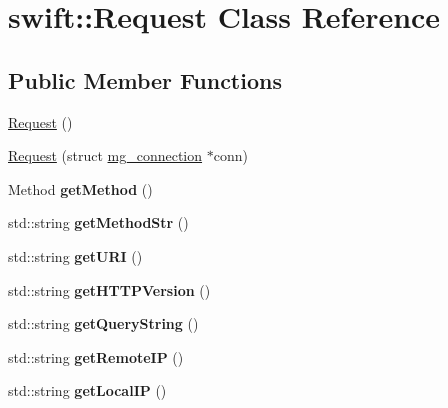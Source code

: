 \hypertarget{classswift_1_1_request}{\section{swift\-:\-:Request Class Reference}
\label{classswift_1_1_request}
}
\subsection*{Public Member Functions}
\begin{DoxyCompactItemize}
\item 
\hyperlink{classswift_1_1_request_a229fbc0523e779262551de6f4ea2c920}{Request} ()
\item 
\hyperlink{classswift_1_1_request_aede86c57b7c39bc6577a4c4f2f2bf0b8}{Request} (struct \hyperlink{structmg__connection}{mg\-\_\-connection} $\ast$conn)
\item 
\hypertarget{classswift_1_1_request_a328f2b94e10e080c5fd1b6387b71137d}{Method {\bfseries get\-Method} ()}\label{classswift_1_1_request_a328f2b94e10e080c5fd1b6387b71137d}

\item 
\hypertarget{classswift_1_1_request_a65044036527328dd16d663e188ea0a9b}{std\-::string {\bfseries get\-Method\-Str} ()}\label{classswift_1_1_request_a65044036527328dd16d663e188ea0a9b}

\item 
\hypertarget{classswift_1_1_request_adc50d14c9210515e0787efc6085f59c3}{std\-::string {\bfseries get\-U\-R\-I} ()}\label{classswift_1_1_request_adc50d14c9210515e0787efc6085f59c3}

\item 
\hypertarget{classswift_1_1_request_ade67461a7ea078229ec148f16b419395}{std\-::string {\bfseries get\-H\-T\-T\-P\-Version} ()}\label{classswift_1_1_request_ade67461a7ea078229ec148f16b419395}

\item 
\hypertarget{classswift_1_1_request_a271ca3d7daa2541890db65560416443e}{std\-::string {\bfseries get\-Query\-String} ()}\label{classswift_1_1_request_a271ca3d7daa2541890db65560416443e}

\item 
\hypertarget{classswift_1_1_request_a4db2baff092ff72728e6514d990375ca}{std\-::string {\bfseries get\-Remote\-I\-P} ()}\label{classswift_1_1_request_a4db2baff092ff72728e6514d990375ca}

\item 
\hypertarget{classswift_1_1_request_a1feb5c291556a2e5b5a8699a28115ac6}{std\-::string {\bfseries get\-Local\-I\-P} ()}\label{classswift_1_1_request_a1feb5c291556a2e5b5a8699a28115ac6}


\end{DoxyCompactItemize}
